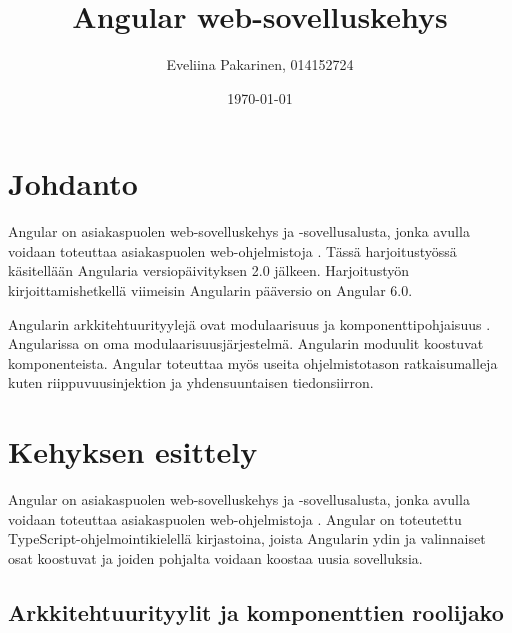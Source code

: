 \documentclass[finnish]{tktltiki2}
\title{Angular web-sovelluskehys}
\author{Eveliina Pakarinen, 014152724}
\date{\today}
\theoremstyle{definition}
\theoremstyle{remark}
\numberwithin{figure}{section}
\begin{document}

\frontmatter      %

\maketitle        %

\tableofcontents  %


\mainmatter       %

\setlength{\parindent}{2.5em}
\setlength{\parskip}{0em}
\renewcommand{\baselinestretch}{1.5}
\large

\section{Johdanto}

Angular on asiakaspuolen web-sovelluskehys ja -sovellusalusta, jonka avulla voidaan toteuttaa asiakaspuolen web-ohjelmistoja \cite{ArchitectureOverview}. Tässä harjoitustyössä käsitellään Angularia versiopäivityksen 2.0 jälkeen. Harjoitustyön kirjoittamishetkellä viimeisin Angularin pääversio on Angular 6.0.

Angularin arkkitehtuurityylejä ovat modulaarisuus ja komponenttipohjaisuus \cite{ArchitectureModules,ArchitectureComponents}. Angularissa on oma modulaarisuusjärjestelmä. Angularin moduulit koostuvat komponenteista. Angular toteuttaa myös useita ohjelmistotason ratkaisumalleja kuten riippuvuusinjektion ja yhdensuuntaisen tiedonsiirron.


\section{Kehyksen esittely}

Angular on asiakaspuolen web-sovelluskehys ja -sovellusalusta, jonka avulla voidaan toteuttaa asiakaspuolen web-ohjelmistoja \cite{ArchitectureOverview}. Angular on toteutettu TypeScript-ohjelmointikielellä kirjastoina, joista Angularin ydin ja valinnaiset osat koostuvat ja joiden pohjalta voidaan koostaa uusia sovelluksia.    

\subsection{Arkkitehtuurityylit ja komponenttien roolijako}
\end{document}
